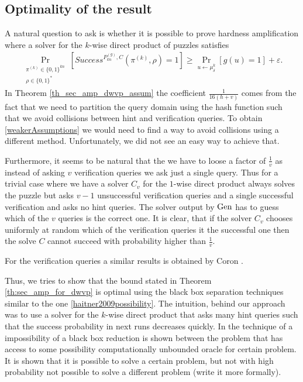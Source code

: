 \subsection{Optimality of the result}
\label{st:discussion}
A natural question to ask is whether it is possible to prove hardness amplification where a solver for the $k$-wise direct product of puzzles satisfies
\begin{align}
    \label{weakerAssumptions}
    \underset{\substack{\pi^{(k)} \in \{0,1\}^{kn} \\ \rho \in \{0,1\}^{*}}}{\Pr}\left[\mathit{Success}^{P_{kn}^{(g)}, C}(\pi^{(k)}, \rho) = 1\right]
    \geq \underset{u \leftarrow \mu_\delta^k}{\Pr}[g(u) = 1] + \varepsilon.
\end{align}
In Theorem \ref{th_sec_amp_dwvp_assum} the coefficient $\frac{1}{16(h+v)}$ comes from the fact that we need to partition the query domain using the hash function
such that we avoid collisions between hint and verification queries.
To obtain \ref{weakerAssumptions} we would need to find a way to avoid collisions using a different method.
Unfortunately, we did not see an easy way to achieve that.

Furthermore, it seems to be natural that the we have to loose a factor of $\frac{1}{v}$ as instead of asking $v$ verification queries we ask just a single query.
Thus for a trivial case where we have a solver $C_v$ for the $1$-wise direct product always solves the puzzle but asks $v-1$ unsuccessful verification
queries and a single successful verification and asks no hint queries.
The solver output by $\operatorname{\text{Gen}}$ has to guess which of the $v$ queries is the correct one.
It is clear, that if the solver $C_v$ chooses uniformly at random which of the verification queries it the successful one then the solve $C$ cannot succeed with
probability higher than $\frac{1}{v}$.

For the verification queries a similar results is obtained by Coron \cite{coron2000exact}.

Thus, we tries to show that the bound stated in Theorem \ref{th:sec_amp_for_dwvp} is optimal using
the black box separation techniques similar to the one \ref{haitner2009possibility}.
The intuition, behind our approach was to use a solver for the $k$-wise direct product that asks many hint queries
such that the success probability in next runs decreases quickly.
In the technique of \cite{haitner2009possibility} a impossibility of a black box reduction is shown between the problem that has access
to some possibility computationally unbounded oracle for certain problem. It is shown that it is possible to solve a certain problem, but
not with high probability not possible to solve a different problem (write it more formally).

